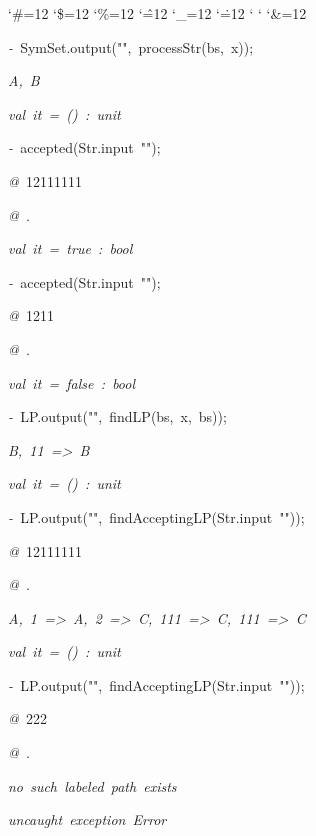 \begin{list}{}
{\setlength{\leftmargin}{\leftmargini}
\setlength{\rightmargin}{0cm}
\setlength{\itemindent}{0cm}
\setlength{\listparindent}{0cm}
\setlength{\itemsep}{0cm}
\setlength{\parsep}{0cm}
\setlength{\labelsep}{0cm}
\setlength{\labelwidth}{0cm}
\catcode`\#=12
\catcode`\$=12
\catcode`\%=12
\catcode`\^=12
\catcode`\_=12
\catcode`\.=12
\catcode`
\catcode`
\catcode`\&=12
\ttfamily}
\small
\item[]\textsl{-\ }SymSet.output("",\ processStr(bs,\ x));
\item[]\textsl{A,\ B}
\item[]\textsl{val\ it\ =\ ()\ :\ unit}
\item[]\textsl{-\ }accepted(Str.input\ "");
\item[]\textsl{@\ }12111111
\item[]\textsl{@\ }.
\item[]\textsl{val\ it\ =\ true\ :\ bool}
\item[]\textsl{-\ }accepted(Str.input\ "");
\item[]\textsl{@\ }1211
\item[]\textsl{@\ }.
\item[]\textsl{val\ it\ =\ false\ :\ bool}
\item[]\textsl{-\ }LP.output("",\ findLP(bs,\ x,\ bs));
\item[]\textsl{B,\ 11\ =>\ B}
\item[]\textsl{val\ it\ =\ ()\ :\ unit}
\item[]\textsl{-\ }LP.output("",\ findAcceptingLP(Str.input\ ""));
\item[]\textsl{@\ }12111111
\item[]\textsl{@\ }.
\item[]\textsl{A,\ 1\ =>\ A,\ 2\ =>\ C,\ 111\ =>\ C,\ 111\ =>\ C}
\item[]\textsl{val\ it\ =\ ()\ :\ unit}
\item[]\textsl{-\ }LP.output("",\ findAcceptingLP(Str.input\ ""));
\item[]\textsl{@\ }222
\item[]\textsl{@\ }.
\item[]\textsl{no\ such\ labeled\ path\ exists}
\item[]
\item[]\textsl{uncaught\ exception\ Error}
\end{list}
